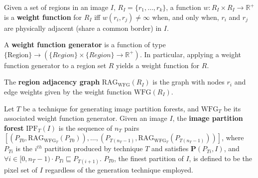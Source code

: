 
\begin{definition}
Given a set of regions in an image $I$, $R_I = \{r_1,\ldots,r_k\}$, a function $w : R_I \times R_I \rightarrow \mathbb{R}^{+}$ is a \textbf{weight function} for $R_I$ iff $w(r_i,r_j) \ne \infty$ when, and only when, $r_i$ and $r_j$ are physically adjacent (share a common border) in $I$.
\end{definition}


\begin{definition}
A \textbf{weight function generator} is a function of type $\{\mbox{Region}\} \rightarrow (\{Region\} \times \{Region\} \rightarrow \mathbb{R}^{+})$. In particular, applying a weight function generator to a region set $R$ yields a weight function for $R$.
\end{definition}

\begin{definition}
The \textbf{region adjacency graph} $\mbox{RAG}_{\mbox{WFG}}(R_I)$ is the graph with nodes $r_i$ and edge weights given by the weight function $\mbox{WFG}(R_I)$.
\end{definition}

\begin{definition}
Let $T$ be a technique for generating image partition forests, and $\mbox{WFG}_T$ be its associated weight function generator. Given an image $I$, the \textbf{image partition forest} $\mbox{IPF}_{T}(I)$ is the sequence of $n_T$ pairs $[(P_{T0},\mbox{RAG}_{\mbox{WFG}_T}(P_{T0})),\ldots,(P_{T(n_T-1)},\mbox{RAG}_{\mbox{WFG}_T}(P_{T(n_T-1)}))]$, where $P_{Ti}$ is the $i^{th}$ partition produced by technique $T$ and satisfies $\mathbf{P}(P_{Ti},I)$, and $\forall i \in [0,n_T-1) \cdot P_{Ti} \sqsubseteq P_{T(i+1)}$. $P_{T0}$, the finest partition of $I$, is defined to be the pixel set of $I$ regardless of the generation technique employed.
\end{definition}

